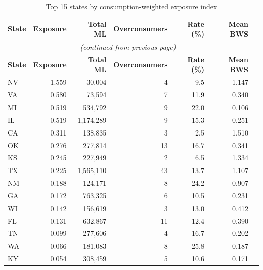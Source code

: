\documentclass[11pt, letterpaper]{article}
\begin{document}
\begin{longtable}{lrrrrrr}
  \caption{Top 15 states by consumption-weighted exposure index}
  \label{tab:states} \\
  \toprule
  \rowcolor{headerbg}
  \color{white}\textbf{State} &
  \color{white}\textbf{Exposure} &
  \color{white}\textbf{Total ML} &
  \color{white}\textbf{Overconsumers} &
  \color{white}\textbf{Rate (\%)} &
  \color{white}\textbf{Mean BWS} \\
  \midrule
  \endfirsthead
  \multicolumn{6}{c}{\small\textit{(continued from previous page)}} \\
  \toprule
  \rowcolor{headerbg}
  \color{white}\textbf{State} &
  \color{white}\textbf{Exposure} &
  \color{white}\textbf{Total ML} &
  \color{white}\textbf{Overconsumers} &
  \color{white}\textbf{Rate (\%)} &
  \color{white}\textbf{Mean BWS} \\
  \midrule
  \endhead
  \bottomrule
  \endfoot
  \rowcolor{rowgrey} NV & 1.559 & 30{,}004     & 4  &  9.5 & 1.147 \\
                     VA & 0.580 & 73{,}594     & 7  & 11.9 & 0.340 \\
  \rowcolor{rowgrey} MI & 0.519 & 534{,}792    & 9  & 22.0 & 0.106 \\
                     IL & 0.519 & 1{,}174{,}289 & 9  & 15.3 & 0.251 \\
  \rowcolor{rowgrey} CA & 0.311 & 138{,}835    & 3  &  2.5 & 1.510 \\
                     OK & 0.276 & 277{,}814    & 13 & 16.7 & 0.341 \\
  \rowcolor{rowgrey} KS & 0.245 & 227{,}949    & 2  &  6.5 & 1.334 \\
                     TX & 0.225 & 1{,}565{,}110 & 43 & 13.7 & 1.107 \\
  \rowcolor{rowgrey} NM & 0.188 & 124{,}171    & 8  & 24.2 & 0.907 \\
                     GA & 0.172 & 763{,}325    & 6  & 10.5 & 0.231 \\
  \rowcolor{rowgrey} WI & 0.142 & 156{,}619    & 3  & 13.0 & 0.412 \\
                     FL & 0.131 & 632{,}867    & 11 & 12.4 & 0.390 \\
  \rowcolor{rowgrey} TN & 0.099 & 277{,}606    & 4  & 16.7 & 0.202 \\
                     WA & 0.066 & 181{,}083    & 8  & 25.8 & 0.187 \\
  \rowcolor{rowgrey} KY & 0.054 & 308{,}459    & 5  & 10.6 & 0.171 \\
\end{longtable}
\end{document}
